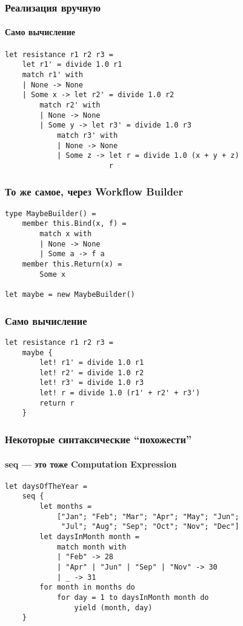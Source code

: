 \documentclass{../../slides-style}
\begin{document}
    \begin{frame}[fragile]
        \frametitle{Реализация вручную}
        \framesubtitle{Само вычисление}
        \begin{verbatim}
let resistance r1 r2 r3 =
    let r1' = divide 1.0 r1
    match r1' with
    | None -> None
    | Some x -> let r2' = divide 1.0 r2
        match r2' with
        | None -> None
        | Some y -> let r3' = divide 1.0 r3
            match r3' with
            | None -> None
            | Some z -> let r = divide 1.0 (x + y + z)
                        r
        \end{verbatim}
    \end{frame}

    \begin{frame}[fragile]
        \frametitle{То же самое, через Workflow Builder}
        \begin{verbatim}
type MaybeBuilder() =
    member this.Bind(x, f) = 
        match x with
        | None -> None
        | Some a -> f a
    member this.Return(x) = 
        Some x
   
let maybe = new MaybeBuilder()
        \end{verbatim}
    \end{frame}

    \begin{frame}[fragile]
        \frametitle{Само вычисление}
        \begin{verbatim}
let resistance r1 r2 r3 = 
    maybe {
        let! r1' = divide 1.0 r1
        let! r2' = divide 1.0 r2
        let! r3' = divide 1.0 r3
        let! r = divide 1.0 (r1' + r2' + r3')
        return r
    }
        \end{verbatim}
    \end{frame}

    \begin{frame}[fragile]
        \frametitle{Некоторые синтаксические ``похожести''}
        \framesubtitle{seq --- это тоже Computation Expression}
        \begin{verbatim}
let daysOfTheYear =
    seq {
        let months =
            ["Jan"; "Feb"; "Mar"; "Apr"; "May"; "Jun";
             "Jul"; "Aug"; "Sep"; "Oct"; "Nov"; "Dec"]
        let daysInMonth month =
            match month with
            | "Feb" -> 28
            | "Apr" | "Jun" | "Sep" | "Nov" -> 30
            | _ -> 31
        for month in months do
            for day = 1 to daysInMonth month do
                yield (month, day)
    }
        \end{verbatim}
    \end{frame}
\end{document}
